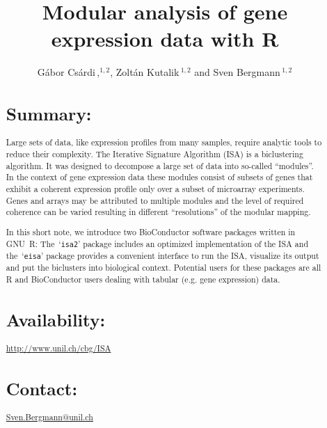 \documentclass{bioinfo}
\newcommand{\Rpackage}[1]{`\texttt{#1}'}
\begin{document}

\title[Modular analysis]{Modular analysis of gene expression data with R}
\author[G\'abor Cs\'ardi \textit{et~al}]{G\'abor Cs\'ardi\,,$^{1,2}$,
  Zolt\'an Kutalik\,$^{1,2}$ and Sven Bergmann\,$^{1,2}$}
\address{$^{1}$Department of Medical Genetics, and
  $^{2}$Swiss Institute of Bioinformatics,
  University of Lausanne, Rue de Bugnon 27, CH-1005 Lausanne,
  Switzerland.}



\maketitle

\begin{abstract}
\section{Summary:}
Large sets of data, like expression profiles from many samples, require
analytic tools to reduce their complexity. The Iterative Signature
Algorithm (ISA) is a biclustering algorithm. 
It was designed to decompose a large set of data into so-called
``modules''. In the context of gene expression data these modules consist of
subsets of genes that exhibit a coherent expression profile only over a
subset of microarray experiments. Genes and arrays may be attributed to
multiple modules and the level of required coherence can be varied resulting
in different ``resolutions'' of the modular mapping. 

In this short note, we introduce two BioConductor \citep{BioC} software
packages written in GNU~R: The~\Rpackage{isa2} package includes an optimized
implementation of the ISA and the~\Rpackage{eisa} package provides a
convenient interface 
to run the ISA, visualize its output and put the biclusters into
biological context. Potential users for these packages are all R and
BioConductor users dealing with tabular (e.g. gene expression) data.

\section{Availability:}
\href{http://www.unil.ch/cbg/ISA}%
{\url{http://www.unil.ch/cbg/ISA}}
\section{Contact:} \href{Sven.Bergmann@unil.ch}{Sven.Bergmann@unil.ch}
\end{abstract}
\end{document}
